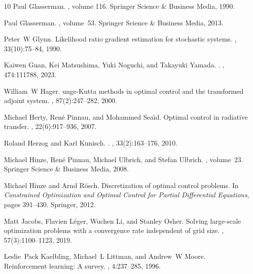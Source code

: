 \documentclass[12pt]{amsart}
\begin{document}
\begin{thebibliography}{10}
Paul Glasserman.
, volume 116.
\newblock Springer Science \& Business Media, 1990.

Paul Glasserman.
, volume~53.
\newblock Springer Science \& Business Media, 2013.

Peter~W Glynn.
\newblock Likelihood ratio gradient estimation for stochastic systems.
, 33(10):75--84, 1990.

Kaiwen Guan, Kei Matsushima, Yuki Noguchi, and Takayuki Yamada.
.
, 474:111788, 2023.

William~W Hager.
unge-{K}utta methods in optimal control and the transformed
  adjoint system.
, 87(2):247--282, 2000.

Michael Herty, Ren{\'e} Pinnau, and Mohammed Sea{\"\i}d.
\newblock Optimal control in radiative transfer.
, 22(6):917--936, 2007.

Roland Herzog and Karl Kunisch.
.
, 33(2):163--176, 2010.

Michael Hinze, Ren{\'e} Pinnau, Michael Ulbrich, and Stefan Ulbrich.
, volume~23.
\newblock Springer Science \& Business Media, 2008.

Michael Hinze and Arnd R{\"o}sch.
\newblock Discretization of optimal control problems.
\newblock In {\em Constrained Optimization and Optimal Control for Partial
  Differential Equations}, pages 391--430. Springer, 2012.

Matt Jacobs, Flavien L{\'e}ger, Wuchen Li, and Stanley Osher.
\newblock Solving large-scale optimization problems with a convergence rate
  independent of grid size.
, 57(3):1100--1123, 2019.

Leslie~Pack Kaelbling, Michael~L Littman, and Andrew~W Moore.
\newblock Reinforcement learning: A survey.
, 4:237--285, 1996.


\end{thebibliography}
\end{document}
